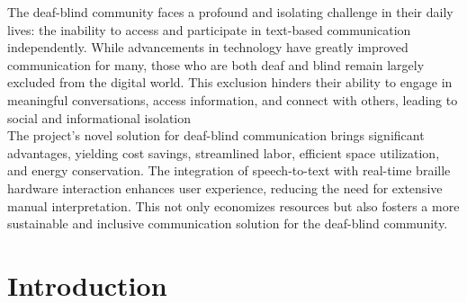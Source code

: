 \documentclass[12pt,a4paper]{report}
\begin{document}
\noindent The deaf-blind community faces a profound and isolating challenge in their daily lives: the inability to access and participate in text-based communication independently. While advancements in technology have greatly improved communication for many, those who are both deaf and blind remain largely excluded from the digital world. This exclusion hinders their ability to engage in meaningful conversations, access information, and connect with others, leading to social and informational isolation \\

\noindent The project's novel solution for deaf-blind communication brings significant advantages, yielding cost savings, streamlined labor, efficient space utilization, and energy conservation. The integration of speech-to-text with real-time braille hardware interaction enhances user experience, reducing the need for extensive manual interpretation. This not only economizes resources but also fosters a more sustainable and inclusive communication solution for the deaf-blind community.

\newpage
\renewcommand{\contentsname}{Table of Contents}
\tableofcontents
\listoffigures
{}
\listoftables
{}
\newpage

\pagestyle{fancy}
\fancyhf{}
\renewcommand{\headrulewidth}{0.5pt}
\renewcommand{\footrulewidth}{0.5pt}

\linespread{0.89}
\justifying
{}
\chapter{Introduction}
\par
\end{document}
